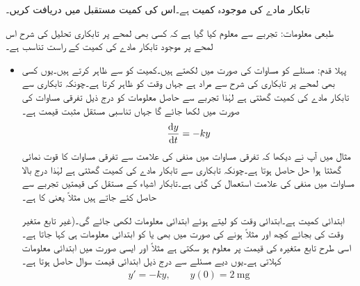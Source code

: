 تابکار  مادے کی موجودہ کمیت  ہے۔اس کی کمیت  مستقبل میں دریافت کریں۔

طبعی معلومات: تجربے سے معلوم کیا گیا ہے کہ کسی بھی لمحے پر تابکاری تحلیل کی شرح اس لمحے پر موجود تابکار مادے کی کمیت کے راست تناسب ہے۔ 
\begin{itemize}
\item
پہلا قدم: مسئلے کو مساوات کی صورت میں لکھتے ہیں۔کمیت کو  سے ظاہر کرتے ہیں۔یوں کسی بھی لمحے پر تابکاری کی شرح سے مراد  ہے جہاں  وقت کو ظاہر کرتا ہے۔چونکہ تابکاری سے تابکار مادے کی کمیت گھٹتی ہے لہٰذا تجربے سے حاصل معلومات کو درج ذیل تفرقی مساوات کی صورت میں لکھا جائے گا جہاں تناسبی مستقل  مثبت قیمت ہے۔
\begin{align}
\frac{\dif y}{\dif t}=-ky
\end{align}
مثال  میں آپ نے دیکھا کہ تفرقی مساوات میں منفی کی علامت سے تفرقی مساوات کا قوت نمائی گھٹتا ہوا حل حاصل ہوتا ہے۔چونکہ تابکاری سے تابکار مادے کی کمیت گھٹتی ہے لہٰذا درج بالا مساوات میں منفی کی علامت استعمال کی گئی ہے۔تابکار اشیاء کے مستقل  کی قیمتیں تجربے سے حاصل کئے جاتے ہیں مثلاً  یعنی    کا  ہے۔

ابتدائی کمیت  ہے۔ابتدائی وقت کو  لیتے  ہوئے ابتدائی معلومات  لکھی  جائے گی۔(غیر تابع متغیر وقت  کی بجائے  کچھ اور مثلاً  ہونے کی صورت میں بھی  یا  کو ابتدائی معلومات ہی کہا جاتا ہے۔اسی طرح تابع متغیرہ  کی قیمت  پر معلوم ہو سکتی ہے مثلاً  اور ایسی صورت میں  ابتدائی معلومات کہلاتی ہے۔یوں دیے مسئلے سے درج ذیل ابتدائی قیمت سوال حاصل ہوتا ہے۔
\begin{align}
y'=-ky,\quad \quad y(0)=\SI{2}{\milli\gram} 
\end{align}


\end{itemize}
